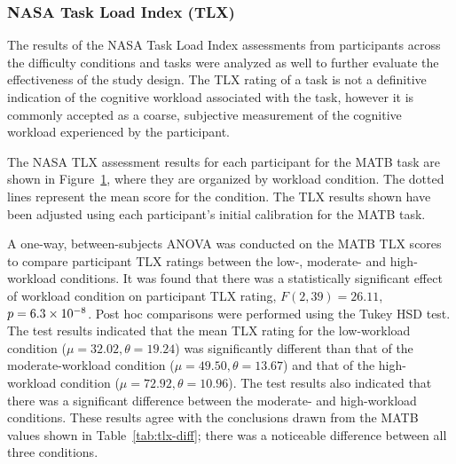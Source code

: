 \documentclass[11pt]{article}
\begin{document}
		\subsubsection{NASA Task Load Index (TLX)}
		The results of the NASA Task Load Index assessments from participants across the difficulty conditions and tasks were analyzed as well to further evaluate the effectiveness of the study design. The TLX rating of a task is not a definitive indication of the cognitive workload associated with the task, however it is commonly accepted as a coarse, subjective measurement of the cognitive workload experienced by the participant.
		
		
		The NASA TLX assessment results for each participant  for the MATB task are shown in Figure~\ref{fig:matb-tlx}, where they are organized by workload condition. The dotted lines represent the mean score for the condition. The TLX results shown have been adjusted using each participant's initial calibration for the MATB task. 
		
		\begin{figure}
		\centering
		\caption{}
		\label{fig:matb-tlx}
		\end{figure} 
		
		A one-way, between-subjects ANOVA was conducted on the MATB TLX scores to compare participant TLX ratings between the low-, moderate- and high-workload conditions. It was found that there was a statistically significant effect of workload condition on participant TLX rating, \(F(2,39) = 26.11\), \(p = \num{6.3e -8}\). Post hoc comparisons were performed using the Tukey HSD test. The test results indicated that the mean TLX rating for the low-workload condition (\(\mu = 32.02, \theta = 19.24\)) was significantly different than that of the moderate-workload condition (\(\mu = 49.50, \theta = 13.67\)) and that of the high-workload condition (\(\mu = 72.92, \theta = 10.96\)). The test results also indicated that there was a significant difference between the moderate- and high-workload conditions. These results agree with the conclusions drawn from the MATB values shown in Table~\ref{tab:tlx-diff}; there was a noticeable difference between all three conditions.
		
		\begin{table}[]
		\caption[NASA-TLX Difference Between Conditions]{Mean NASA-TLX Difference Between Conditions}
		\centering
		\label{tab:tlx-diff}
		\end{table}
	
\end{document}
